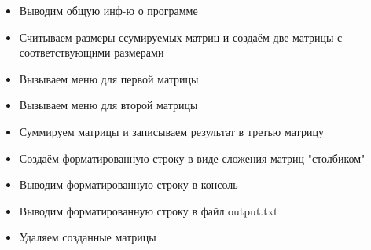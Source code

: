 \begin{itemize}
	\item Выводим общую инф-ю о программе
	\item Считываем размеры ссумируемых матриц и создаём две матрицы
	с соответствующими размерами
	\item Вызываем меню для первой матрицы
	\item Вызываем меню для второй матрицы
	\item Суммируем матрицы и записываем результат в третью матрицу
	\item Создаём форматированную строку в виде сложения матриц "столбиком"
	\item Выводим форматированную строку в консоль
	\item Выводим форматированную строку в файл output.txt
	\item Удаляем созданные матрицы
\end{itemize}